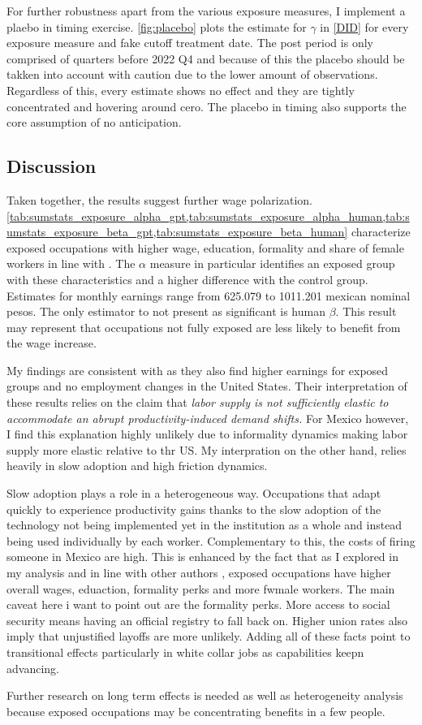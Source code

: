 For further robustness apart from the various exposure measures, I implement a plaebo in timing exercise. \cref{fig:placebo} plots the estimate for $\gamma$ in \cref{DID} for every exposure measure and fake cutoff treatment date. The post period is only comprised of quarters before 2022 Q4 and because of this the placebo should be takken into account with caution due to the lower amount of observations. Regardless of this, every estimate shows no effect and they are tightly concentrated and hovering around cero. The placebo in timing also supports the core assumption of no anticipation.

\subsection{Discussion}

Taken together, the results suggest further wage polarization. \cref{tab:sumstats_exposure_alpha_gpt,tab:sumstats_exposure_alpha_human,tab:sumstats_exposure_beta_gpt,tab:sumstats_exposure_beta_human} characterize exposed occupations with higher wage, education, formality and share of female workers in line with \cite{azuara,worldbank,martinez2024risk}. The $\alpha$ measure in particular identifies an exposed group with these characteristics and a higher difference with the control group. Estimates for monthly earnings range from 625.079 to 1011.201 mexican nominal pesos. The only estimator to not present as significant is human $\beta$. This result may represent that occupations not fully exposed are less likely to benefit from the wage increase.

My findings are consistent with \cite{Dang} as they also find higher earnings for exposed groups and no employment changes in the United States. Their interpretation of these results relies on the claim that \textit{labor supply is not sufficiently elastic to accommodate an abrupt productivity-induced demand shifts.} For Mexico however, I find this explanation highly unlikely due to informality dynamics making labor supply more elastic relative to thr US. My interpration on the other hand, relies heavily in slow adoption and high friction dynamics.

Slow adoption plays a role in a heterogeneous way. Occupations that adapt quickly to  experience productivity gains thanks to the slow adoption of the technology not being implemented yet in the institution as a whole and instead being used individually by each worker. Complementary to this, the costs of firing someone in Mexico are high. This is enhanced by the fact that as I explored in my analysis and in line with other authors \citep{azuara,martinez2024risk,worldbank}, exposed occupations have higher overall wages, eduaction, formality perks and more fwmale workers. The main caveat here i want to point out are the formality perks. More access to social security means having an official registry to fall back on. Higher union rates also imply that unjustified layoffs are more unlikely. Adding all of these facts point to transitional effects particularly in white collar jobs as  capabilities keepn advancing.

Further research on long term effects is needed as well as heterogeneity analysis because exposed occupations may be concentrating benefits in a few people.